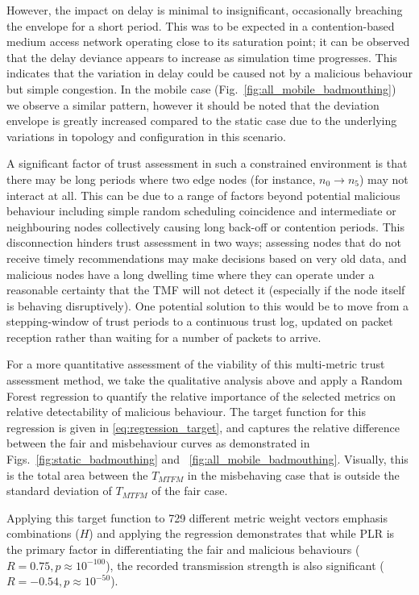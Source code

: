 \documentclass[conference]{IEEEtran}
\begin{document}
However, the impact on delay is minimal to insignificant, occasionally breaching the envelope for a short period. 
This was to be expected in a contention-based medium access network operating close to its saturation point; it can be observed that the delay deviance appears to increase as simulation time progresses. 
This indicates that the variation in delay could be caused not by a malicious behaviour but simple congestion.
In the mobile case (Fig.~\ref{fig:all_mobile_badmouthing}) we observe a similar pattern, however it should be noted that the deviation envelope is greatly increased compared to the static case due to the underlying variations in topology and configuration in this scenario.

A significant factor of trust assessment in such a constrained environment is that there may be long periods where two edge nodes (for instance, $n_0 \to n_5$) may not interact at all. 
This can be due to a range of factors beyond potential malicious behaviour including simple random scheduling coincidence and intermediate or neighbouring nodes collectively causing long back-off or contention periods.
This disconnection hinders trust assessment in two ways; assessing nodes that do not receive timely recommendations may make decisions based on very old data, and malicious nodes have a long dwelling time where they can operate under a reasonable certainty that the TMF will not detect it (especially if the node itself is behaving disruptively).
One potential solution to this would be to move from a stepping-window of trust periods to a continuous trust log, updated on packet reception rather than waiting for a number of packets to arrive.

For a more quantitative assessment of the viability of this multi-metric trust assessment method, we take the qualitative analysis above and apply a Random Forest regression\cite{Breiman2001} to quantify the relative importance of the selected metrics on relative detectability of malicious behaviour. 
The target function for this regression is given in \eqref{eq:regression_target}, and captures the relative difference between the fair and misbehaviour curves as demonstrated in Figs.~\ref{fig:static_badmouthing} and ~\ref{fig:all_mobile_badmouthing}.
Visually, this is the total area between the $T_{MTFM}$ in the misbehaving case that is outside the standard deviation of $T_{MTFM}$ of the fair case.

Applying this target function to 729 different metric weight vectors emphasis combinations ($H$) and applying the regression demonstrates that while PLR is the primary factor in differentiating the fair and malicious behaviours ($R=0.75, p\approx10^{-100}$), the recorded transmission strength is also significant ($R=-0.54, p\approx10^{-50}$).
\end{document}
